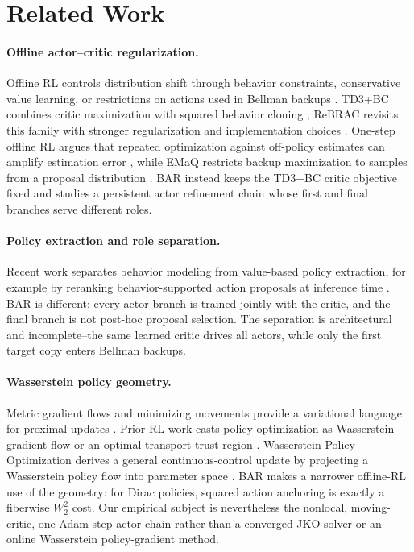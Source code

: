 \section{Related Work}
\label{sec:related}

\paragraph{Offline actor--critic regularization.}
Offline RL controls distribution shift through behavior constraints, conservative value learning, or restrictions on actions used in Bellman backups \citep{fujimoto2019offpolicy,kumar2019bear,kumar2020cql}. TD3+BC combines critic maximization with squared behavior cloning \citep{fujimoto2021minimalist}; ReBRAC revisits this family with stronger regularization and implementation choices \citep{tarasov2023revisiting}. One-step offline RL argues that repeated optimization against off-policy estimates can amplify estimation error \citep{brandfonbrener2021onestep}, while EMaQ restricts backup maximization to samples from a proposal distribution \citep{ghasemipour2021emaq}. BAR instead keeps the TD3+BC critic objective fixed and studies a persistent actor refinement chain whose first and final branches serve different roles.

\paragraph{Policy extraction and role separation.}
Recent work separates behavior modeling from value-based policy extraction, for example by reranking behavior-supported action proposals at inference time \citep{lin2026decoupling}. BAR is different: every actor branch is trained jointly with the critic, and the final branch is not post-hoc proposal selection. The separation is architectural and incomplete--the same learned critic drives all actors, while only the first target copy enters Bellman backups.

\paragraph{Wasserstein policy geometry.}
Metric gradient flows and minimizing movements provide a variational language for proximal updates \citep{ambrosio2005gradient,otto2001geometry}. Prior RL work casts policy optimization as Wasserstein gradient flow or an optimal-transport trust region \citep{zhang2018policy,moskovitz2021efficient,terpin2022trust,song2023metric}. Wasserstein Policy Optimization derives a general continuous-control update by projecting a Wasserstein policy flow into parameter space \citep{pfau2025wpo}. BAR makes a narrower offline-RL use of the geometry: for Dirac policies, squared action anchoring is exactly a fiberwise $W_2^2$ cost. Our empirical subject is nevertheless the nonlocal, moving-critic, one-Adam-step actor chain rather than a converged JKO solver or an online Wasserstein policy-gradient method.
